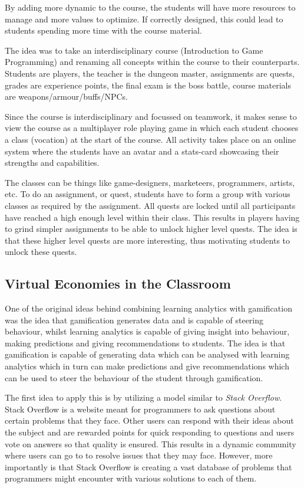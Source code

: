 \documentclass[11pt]{article}
\begin{document}
By adding more dynamic to the course, the students will have more resources to manage and more values to optimize. If correctly designed, this could lead to students spending more time with the course material. 

The idea was to take an interdisciplinary course (Introduction to Game Programming) and renaming all concepts within the course to their counterparts. Students are players, the teacher is the dungeon master, assignments are quests, grades are experience points, the final exam is the boss battle, course materials are weapons/armour/buffs/NPCs.

Since the course is interdisciplinary and focussed on teamwork, it makes sense to view the course as a multiplayer role playing game in which each student chooses a class (vocation) at the start of the course. All activity takes place on an online system where the students have an avatar and a stats-card showcasing their strengths and capabilities.

The classes can be things like game-designers, marketeers, programmers, artists, etc. To do an assignment, or quest, students have to form a group with various classes as required by the assignment. All quests are locked until all participants have reached a high enough level within their class. This results in players having to grind simpler assignments to be able to unlock higher level quests. The idea is that these higher level quests are more interesting, thus motivating students to unlock these quests. 

\subsection{Virtual Economies in the Classroom}

One of the original ideas behind combining learning analytics with gamification was the idea that gamification generates data and is capable of steering behaviour, whilst learning analytics is capable of giving insight into behaviour, making predictions and giving recommendations to students. The idea is that gamification is capable of generating data which can be analysed with learning analytics which in turn can make predictions and give recommendations which can be used to steer the behaviour of the student through gamification. 

The first idea to apply this is by utilizing a model similar to \emph{Stack Overflow}. Stack Overflow is a website meant for programmers to ask questions about certain problems that they face. Other users can respond with their ideas about the subject and are rewarded points for quick responding to questions and users vote on answers so that quality is ensured. This results in a dynamic community where users can go to to resolve issues that they may face. However, more importantly is that Stack Overflow is creating a vast database of problems that programmers might encounter with various solutions to each of them. 
\end{document}
